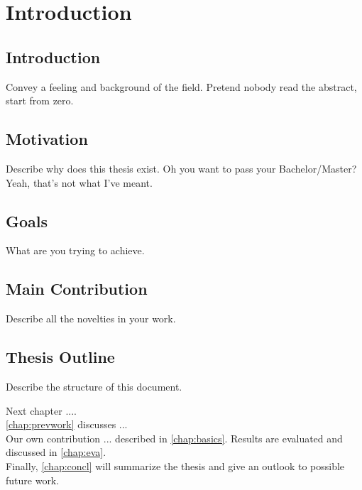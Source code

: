 \documentclass[thesis.tex]{subfiles}
\begin{document}
\chapter{Introduction}
\label{chap:introduction}


\section{Introduction}
Convey a feeling and background of the field. Pretend nobody read the abstract, start from zero.

\section{Motivation}
Describe why does this thesis exist. Oh you want to pass your Bachelor/Master? Yeah, that's not what I've meant.

\section{Goals} \label{bib:goals}
What are you trying to achieve.

\section{Main Contribution}
Describe all the novelties in your work.

\section{Thesis Outline}
Describe the structure of this document.

Next chapter ....
\\
\autoref{chap:prevwork} discusses ...
\\
Our own contribution ... described in \autoref{chap:basics}.
Results are evaluated and discussed in \autoref{chap:eva}.
\\
Finally, \autoref{chap:concl} will summarize the thesis and give an outlook to possible future work.

\subfilebib %
\end{document}

